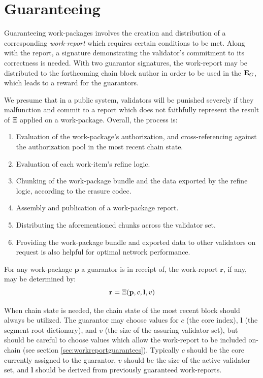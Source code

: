 \section{Guaranteeing}\label{sec:guaranteeing}

Guaranteeing work-packages involves the creation and distribution of a corresponding \emph{work-report} which requires certain conditions to be met. Along with the report, a signature demonstrating the validator's commitment to its correctness is needed. With two guarantor signatures, the work-report may be distributed to the forthcoming \Jam chain block author in order to be used in the $\mathbf{E}_G$, which leads to a reward for the guarantors.

We presume that in a public system, validators will be punished severely if they malfunction and commit to a report which does not faithfully represent the result of $\Xi$ applied on a work-package. Overall, the process is:

\begin{enumerate}
    \item Evaluation of the work-package's authorization, and cross-referencing against the authorization pool in the most recent \Jam chain state.
    \item Evaluation of each work-item's refine logic.
    \item Chunking of the work-package bundle and the data exported by the refine logic, according to the erasure codec.
    \item Assembly and publication of a work-package report.
    \item Distributing the aforementioned chunks across the validator set.
    \item Providing the work-package bundle and exported data to other validators on request is also helpful for optimal network performance.
\end{enumerate}

For any work-package $\mathbf{p}$ a guarantor is in receipt of, the work-report $\mathbf{r}$, if any, may be determined by:
\begin{equation}
  \mathbf{r} = \Xi(\mathbf{p}, c, \mathbf{l}, v)
\end{equation}

When \Jam chain state is needed, the chain state of the most recent block should always be utilized. The guarantor may choose values for $c$ (the core index), $\mathbf{l}$ (the segment-root dictionary), and $v$ (the size of the assuring validator set), but should be careful to choose values which allow the work-report to be included on-chain (see section \ref{sec:workreportguarantees}). Typically $c$ should be the core currently assigned to the guarantor, $v$ should be the size of the active validator set, and $\mathbf{l}$ should be derived from previously guaranteed work-reports.


